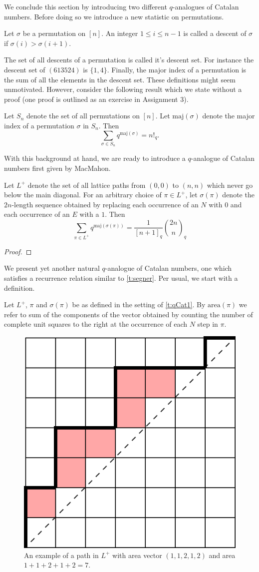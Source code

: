 We conclude this section by introducing two different $q$-analogues of Catalan numbers. Before doing so we introduce a new statistic on permutations. 
\begin{definition}
Let $\sigma$ be a permutation on $[n]$. An integer $1\leq i\leq n-1$ is called a descent of $\sigma$ if $\sigma(i)>\sigma(i+1)$. 
\end{definition}
The set of all descents of a permutation is called it's descent set. For instance the descent set of $(613524)$ is $\{1,4\}$. Finally, the major index of a permutation is the sum of all the elements in the descent set. These definitions might seem unmotivated. However, consider the following result which we state without a proof (one proof is outlined as an exercise in Assignment 3). 
\begin{theorem}
Let $S_n$ denote the set of all permutations on $[n]$. Let $\text{maj}(\sigma)$ denote the major index of a permutation $\sigma$ in $S_n$. Then
\[
    \sum_{\sigma\in S_n} q^{\text{maj}(\sigma)} = n!_q.
\]
\end{theorem}
With this background at hand, we are ready to introduce a $q$-analogue of Catalan numbers first given by MacMahon.
\begin{theorem}
Let $L^+$ denote the set of all lattice paths from $(0,0)$ to $(n,n)$ which never go below the main diagonal. For an arbitrary choice of $\pi\in L^+$, let $\sigma(\pi)$ denote the $2n$-length sequence obtained by replacing each occurrence of an $N$ with $0$ and each occurrence of an $E$ with a $1$. Then 
    \[
    \sum_{\pi\in L^+} q^{\text{maj}(\sigma(\pi))} = \dfrac{1}{[n+1]_q}\binom{2n}{n}_q
    \]
\label{t:qCat1}
\end{theorem}
\begin{proof}
\end{proof}
We present yet another natural $q$-analogue of Catalan numbers, one which satisfies a recurrence relation similar to \cref{t:segner}. Per usual, we start with a definition.
\begin{definition}
    Let $L^+$, $\pi$ and $\sigma(\pi)$ be as defined in the setting of \cref{t:qCat1}. By $\text{area}(\pi)$ we refer to sum of the components of the vector obtained by counting the number of complete unit squares to the right at the occurrence of each $N$ step in $\pi$.
\end{definition}
\begin{figure}[H]
    \centering
    \includegraphics[width=0.5\linewidth]{Images/Figure31.png}
    \caption{An example of a path in $L^+$ with area vector $(1,1,2,1,2)$ and area $1+1+2+1+2=7$.}
    \label{fig:enter-label}
\end{figure}
